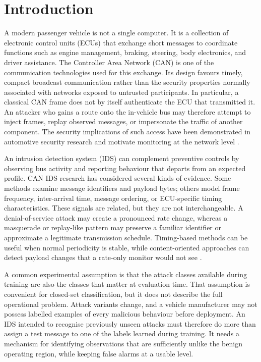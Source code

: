 \documentclass[journal]{IEEEtran}
\begin{document}
\section{Introduction}
A modern passenger vehicle is not a single computer. It is a collection of electronic control units (ECUs) that exchange short messages to coordinate functions such as engine management, braking, steering, body electronics, and driver assistance. The Controller Area Network (CAN) is one of the communication technologies used for this exchange. Its design favours timely, compact broadcast communication rather than the security properties normally associated with networks exposed to untrusted participants. In particular, a classical CAN frame does not by itself authenticate the ECU that transmitted it. An attacker who gains a route onto the in-vehicle bus may therefore attempt to inject frames, replay observed messages, or impersonate the traffic of another component. The security implications of such access have been demonstrated in automotive security research and motivate monitoring at the network level \cite{bosch1991can,rajapaksha2023survey,cho2016fingerprinting}.

An intrusion detection system (IDS) can complement preventive controls by observing bus activity and reporting behaviour that departs from an expected profile. CAN IDS research has considered several kinds of evidence. Some methods examine message identifiers and payload bytes; others model frame frequency, inter-arrival time, message ordering, or ECU-specific timing characteristics. These signals are related, but they are not interchangeable. A denial-of-service attack may create a pronounced rate change, whereas a masquerade or replay-like pattern may preserve a familiar identifier or approximate a legitimate transmission schedule. Timing-based methods can be useful when normal periodicity is stable, while content-oriented approaches can detect payload changes that a rate-only monitor would not see \cite{muter2011entropy,cho2016fingerprinting,rajapaksha2023survey}.

A common experimental assumption is that the attack classes available during training are also the classes that matter at evaluation time. That assumption is convenient for closed-set classification, but it does not describe the full operational problem. Attack variants change, and a vehicle manufacturer may not possess labelled examples of every malicious behaviour before deployment. An IDS intended to recognise previously unseen attacks must therefore do more than assign a test message to one of the labels learned during training. It needs a mechanism for identifying observations that are sufficiently unlike the benign operating region, while keeping false alarms at a usable level.
\end{document}
